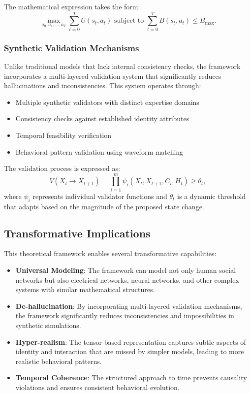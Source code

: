 \documentclass[11pt,a4paper]{article}
\begin{document}
The mathematical expression takes the form:
\begin{equation}
\max_{a_0,a_1,\ldots,a_T} \sum_{t=0}^T U(s_t, a_t) \text{ subject to } \sum_{t=0}^T B(s_t, a_t) \leq B_{\max}.
\end{equation}

\subsubsection{Synthetic Validation Mechanisms}

Unlike traditional models that lack internal consistency checks, the framework incorporates a multi-layered validation system that significantly reduces hallucinations and inconsistencies. This system operates through:

\begin{itemize}
\item Multiple synthetic validators with distinct expertise domains
\item Consistency checks against established identity attributes
\item Temporal feasibility verification
\item Behavioral pattern validation using waveform matching
\end{itemize}

The validation process is expressed as:
\begin{equation}
V(X_t \to X_{t+1}) = \prod_{i=1}^m \psi_i(X_t, X_{t+1}, C_i, H_t) \geq \theta_t,
\end{equation}
where $\psi_i$ represents individual validator functions and $\theta_t$ is a dynamic threshold that adapts based on the magnitude of the proposed state change.

\subsection{Transformative Implications}

This theoretical framework enables several transformative capabilities:

\begin{itemize}
\item \textbf{Universal Modeling}: The framework can model not only human social networks but also electrical networks, neural networks, and other complex systems with similar mathematical structures.
\item \textbf{De-hallucination}: By incorporating multi-layered validation mechanisms, the framework significantly reduces inconsistencies and impossibilities in synthetic simulations.
\item \textbf{Hyper-realism}: The tensor-based representation captures subtle aspects of identity and interaction that are missed by simpler models, leading to more realistic behavioral patterns.
\item \textbf{Temporal Coherence}: The structured approach to time prevents causality violations and ensures consistent behavioral evolution.
\end{itemize}
\end{document}
